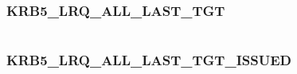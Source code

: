 \documentclass[letterpaper,10pt,english]{sphinxmanual}
\begin{document}
\begin{fulllineitems}
\label{appdev/refs/macros/KRB5_LRQ_ALL_LAST_REQ:KRB5_LRQ_ALL_LAST_REQ}
\end{fulllineitems}


\begin{tabulary}{\linewidth}{|L|L|}
\hline

 & 
\\\hline
\end{tabulary}



\subsubsection{KRB5\_LRQ\_ALL\_LAST\_TGT}
\label{appdev/refs/macros/KRB5_LRQ_ALL_LAST_TGT:krb5-lrq-all-last-tgt-data}\label{appdev/refs/macros/KRB5_LRQ_ALL_LAST_TGT:krb5-lrq-all-last-tgt}\label{appdev/refs/macros/KRB5_LRQ_ALL_LAST_TGT::doc}

\begin{fulllineitems}
\label{appdev/refs/macros/KRB5_LRQ_ALL_LAST_TGT:KRB5_LRQ_ALL_LAST_TGT}
\end{fulllineitems}


\begin{tabulary}{\linewidth}{|L|L|}
\hline

 & 
\\\hline
\end{tabulary}



\subsubsection{KRB5\_LRQ\_ALL\_LAST\_TGT\_ISSUED}
\label{appdev/refs/macros/KRB5_LRQ_ALL_LAST_TGT_ISSUED::doc}\label{appdev/refs/macros/KRB5_LRQ_ALL_LAST_TGT_ISSUED:krb5-lrq-all-last-tgt-issued}\label{appdev/refs/macros/KRB5_LRQ_ALL_LAST_TGT_ISSUED:krb5-lrq-all-last-tgt-issued-data}

\begin{fulllineitems}
\label{appdev/refs/macros/KRB5_LRQ_ALL_LAST_TGT_ISSUED:KRB5_LRQ_ALL_LAST_TGT_ISSUED}
\end{fulllineitems}
\end{document}
